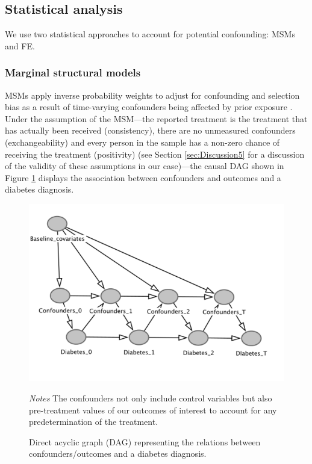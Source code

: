 \subsection{Statistical analysis}


We use two statistical approaches to account for potential confounding: \acfp{MSM} and \acf{FE}. 

\subsubsection*{Marginal structural models}

\acp{MSM} apply inverse probability weights to adjust for confounding and selection bias as a result of time-varying confounders being affected by prior exposure \autocite{Robins2000}. Under the assumption of the \ac{MSM}\autocite{Robins2000}---the reported treatment is the treatment that has actually been received (consistency), there are no unmeasured confounders (exchangeability) and every person in the sample has a non-zero chance of receiving the treatment (positivity) (see Section \ref{sec:Discussion5} for a discussion of the validity of these assumptions in our case)---the causal DAG shown in Figure \ref{fig:DAG} displays the association between confounders and outcomes and a diabetes diagnosis.

\begin{figure}
\begin{center}
\caption{\label{fig:DAG} Direct acyclic graph (DAG) representing the relations between confounders/outcomes and a diabetes diagnosis.}
\includegraphics[scale=0.7]{Chapter5/Figures/dag}
\end{center}
\footnotesize{\textit{Notes} The confounders not only include control variables but also pre-treatment values of our outcomes of interest to account for any predetermination of the treatment.}

\end{figure}


